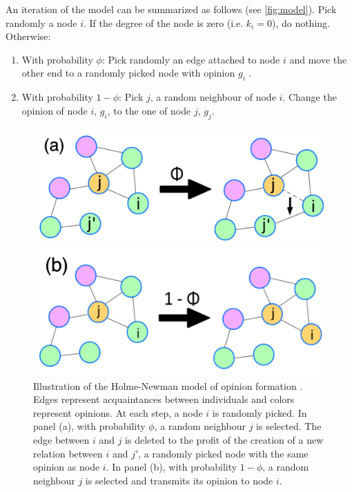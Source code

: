 \documentclass[11pt]{article}
\begin{document}
An iteration of the model can be summarized as follows (see \autoref{fig:model}). Pick randomly a node $i$. If the degree of the node is zero (i.e. $k_i=0$), do nothing. Otherwise: 
\begin{enumerate}
    \item With probability $\phi$: Pick randomly an edge attached to node $i$ and move the other end to a randomly picked node with opinion $g_i$ .
     \item With probability $1-\phi$: Pick $j$, a random neighbour of node $i$. Change the opinion of node $i$, $g_i$, to the one of node $j$, $g_j$.
\end{enumerate}
\begin{figure}
\centering
\begin{minipage}{.5\textwidth}
  \centering
  \includegraphics[width=0.9\linewidth]{figures/phi.png}
\end{minipage}%
\begin{minipage}{.5\textwidth}
  \centering
  \includegraphics[width=0.9\linewidth]{figures/1-phi.png}
\end{minipage}
\caption{Illustration of the Holme-Newman model of opinion formation \citep{Holme2006}. Edges represent acquaintances between individuals and colors represent opinions. At each step, a node $i$ is randomly picked. In panel (a), with probability $\phi$,  a random neighbour $j$ is selected. The edge between $i$ and $j$ is deleted to the profit of the creation of a new relation between $i$ and $j'$, a randomly picked node with the same opinion as node $i$. In panel (b),  with probability $1 - \phi$, a random neighbour $j$ is selected and transmits its opinion to node $i$.}
    \label{fig:model}
\end{figure}
\end{document}
